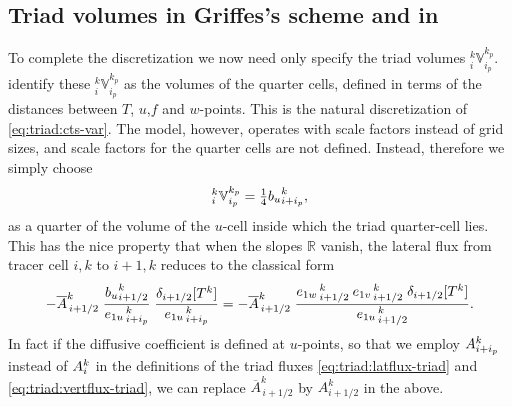 \documentclass[NEMO_book]{subfiles}
\begin{document}
\subsection{Triad volumes in Griffes's scheme and in \NEMO}
To complete the discretization we now need only specify the triad
volumes $_i^k\mathbb{V}_{i_p}^{k_p}$. \citet{Griffies_al_JPO98} identify
these $_i^k\mathbb{V}_{i_p}^{k_p}$ as the volumes of the quarter
cells, defined in terms of the distances between $T$, $u$,$f$ and
$w$-points. This is the natural discretization of
\eqref{eq:triad:cts-var}. The \NEMO model, however, operates with scale
factors instead of grid sizes, and scale factors for the quarter
cells are not defined. Instead, therefore we simply choose
\begin{equation}
  \label{eq:triad:V-NEMO}
  _i^k\mathbb{V}_{i_p}^{k_p}=\textstyle\frac{1}{4} {b_u}_{i+i_p}^k,
\end{equation}
as a quarter of the volume of the $u$-cell inside which the triad
quarter-cell lies. This has the nice property that when the slopes
$\mathbb{R}$ vanish, the lateral flux from tracer cell $i,k$ to
$i+1,k$ reduces to the classical form
\begin{equation}
  \label{eq:triad:lat-normal}
-\overline{{A}}_{\,i+1/2}^k\;
\frac{{b_u}_{i+1/2}^k}{{e_{1u}}_{\,i + i_p}^{\,k}}
\;\frac{\delta_{i+ 1/2}[T^k] }{{e_{1u}}_{\,i + i_p}^{\,k}}
 = -\overline{{A}}_{\,i+1/2}^k\;\frac{{e_{1w}}_{\,i + 1/2}^{\,k}\:{e_{1v}}_{\,i + 1/2}^{\,k}\;\delta_{i+ 1/2}[T^k]}{{e_{1u}}_{\,i + 1/2}^{\,k}}.
\end{equation}
In fact if the diffusive coefficient is defined at $u$-points, so that
we employ ${A}_{i+i_p}^k$ instead of  ${A}_i^k$ in the definitions of the
triad fluxes \eqref{eq:triad:latflux-triad} and \eqref{eq:triad:vertflux-triad},
we can replace $\overline{A}_{\,i+1/2}^k$ by $A_{i+1/2}^k$ in the above.
\end{document}
